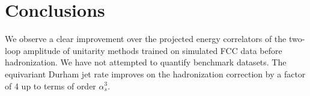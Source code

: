 \section{Conclusions}\label{sec:conclusions}

We observe a clear improvement over the projected energy correlators of
the two-loop amplitude of unitarity methods trained on simulated FCC
data before hadronization. We have not attempted to quantify benchmark
datasets. The equivariant Durham jet rate improves on the hadronization
correction by a factor of 4 up to terms of order $\alpha_s^3$.

